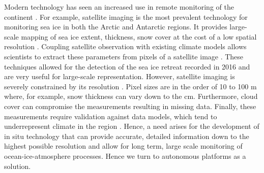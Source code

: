 
Modern technology has seen an increased use in remote monitoring of the continent \cite{kennicutt2016delivering}. For example, satellite imaging is the most prevalent technology for monitoring sea ice in both the Arctic and Antarctic regions. It provides large-scale mapping of sea ice extent, thickness, snow cover at  the cost of a low spatial resolution \cite{turner2017unprecedented,galin2011validation,alberello2019drift}. Coupling satellite observation with existing climate models allows scientists to extract these parameters from pixels of a satellite image \cite{galin2011validation}. These techniques allowed for the detection of the sea ice retreat recorded in 2016 \cite{turner2017unprecedented} and are very useful for large-scale representation. However, satellite imaging is severely constrained by its resolution \cite{emery1997satellite}. Pixel sizes are in the order of 10 to 100 m \cite{galin2011validation} where, for example, snow thickness can vary down to the cm. Furthermore, cloud cover can compromise the measurements resulting in missing data. Finally, these measurements require validation against data models, which tend to underrepresent climate in the region \cite{galin2011validation,emery1997satellite}. Hence, a need arises for the development of in situ technology that can provide accurate, detailed information down to the highest possible resolution and allow for long term, large scale monitoring of ocean-ice-atmosphere processes. Hence we turn to autonomous platforms as a solution.\par 
